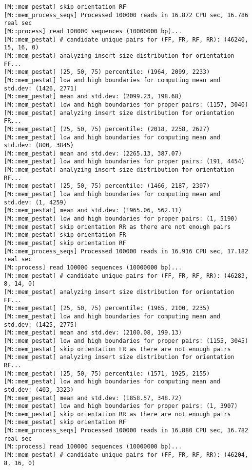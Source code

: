 \begin{lstlisting}
[M::mem_pestat] skip orientation RF
[M::mem_process_seqs] Processed 100000 reads in 16.872 CPU sec, 16.786 real sec
[M::process] read 100000 sequences (10000000 bp)...
[M::mem_pestat] # candidate unique pairs for (FF, FR, RF, RR): (46240, 15, 16, 0)
[M::mem_pestat] analyzing insert size distribution for orientation FF...
[M::mem_pestat] (25, 50, 75) percentile: (1964, 2099, 2233)
[M::mem_pestat] low and high boundaries for computing mean and std.dev: (1426, 2771)
[M::mem_pestat] mean and std.dev: (2099.23, 198.68)
[M::mem_pestat] low and high boundaries for proper pairs: (1157, 3040)
[M::mem_pestat] analyzing insert size distribution for orientation FR...
[M::mem_pestat] (25, 50, 75) percentile: (2018, 2258, 2627)
[M::mem_pestat] low and high boundaries for computing mean and std.dev: (800, 3845)
[M::mem_pestat] mean and std.dev: (2265.13, 387.07)
[M::mem_pestat] low and high boundaries for proper pairs: (191, 4454)
[M::mem_pestat] analyzing insert size distribution for orientation RF...
[M::mem_pestat] (25, 50, 75) percentile: (1466, 2187, 2397)
[M::mem_pestat] low and high boundaries for computing mean and std.dev: (1, 4259)
[M::mem_pestat] mean and std.dev: (1965.06, 562.11)
[M::mem_pestat] low and high boundaries for proper pairs: (1, 5190)
[M::mem_pestat] skip orientation RR as there are not enough pairs
[M::mem_pestat] skip orientation FR
[M::mem_pestat] skip orientation RF
[M::mem_process_seqs] Processed 100000 reads in 16.916 CPU sec, 17.182 real sec
[M::process] read 100000 sequences (10000000 bp)...
[M::mem_pestat] # candidate unique pairs for (FF, FR, RF, RR): (46283, 8, 14, 0)
[M::mem_pestat] analyzing insert size distribution for orientation FF...
[M::mem_pestat] (25, 50, 75) percentile: (1965, 2100, 2235)
[M::mem_pestat] low and high boundaries for computing mean and std.dev: (1425, 2775)
[M::mem_pestat] mean and std.dev: (2100.08, 199.13)
[M::mem_pestat] low and high boundaries for proper pairs: (1155, 3045)
[M::mem_pestat] skip orientation FR as there are not enough pairs
[M::mem_pestat] analyzing insert size distribution for orientation RF...
[M::mem_pestat] (25, 50, 75) percentile: (1571, 1925, 2155)
[M::mem_pestat] low and high boundaries for computing mean and std.dev: (403, 3323)
[M::mem_pestat] mean and std.dev: (1858.57, 348.72)
[M::mem_pestat] low and high boundaries for proper pairs: (1, 3907)
[M::mem_pestat] skip orientation RR as there are not enough pairs
[M::mem_pestat] skip orientation RF
[M::mem_process_seqs] Processed 100000 reads in 16.880 CPU sec, 16.782 real sec
[M::process] read 100000 sequences (10000000 bp)...
[M::mem_pestat] # candidate unique pairs for (FF, FR, RF, RR): (46204, 8, 16, 0)

\end{lstlisting}
